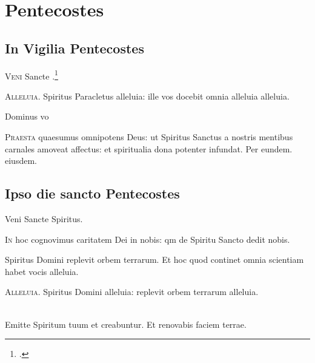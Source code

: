 \chapter{Pentecostes}

\section{In Vigilia Pentecostes}

\lettrine{V}{eni} Sancte .\footcite[193r]{bp1502}


\lettrine{A}{lleluia.} Spiritus Paracletus alleluia:
ille vos docebit omnia alleluia alleluia.

Dominus vo

\lettrine{P}{raesta} quaesumus omnipotens Deus:
ut Spiritus Sanctus a nostris mentibus carnales amoveat affectus:
et spiritualia dona potenter infundat.
Per eundem.  eiusdem.


\section{Ipso die sancto Pentecostes}

Veni Sancte Spiritus.

\lettrine{I}{n} hoc cognovimus caritatem Dei in nobis:
qm de Spiritu Sancto dedit nobis.


Spiritus Domini replevit orbem terrarum.
Et hoc quod continet omnia scientiam habet vocis alleluia.

\lettrine{A}{lleluia.} Spiritus Domini alleluia:
replevit orbem terrarum alleluia.

\\
Emitte Spiritum tuum et creabuntur.
Et renovabis faciem terrae.

